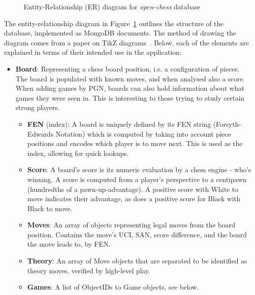\documentclass[architecture.tex]{subfiles}
\begin{document}
\begin{figure}[H]
    
    \caption{Entity-Relationship (ER) diagram for \textit{open-chess} database}
    \label{fig:er-diagram}
\end{figure}

The entity-relationship diagram in Figure~\ref{fig:er-diagram} outlines the structure of the 
database, implemented as MongoDB documents.
The method of drawing the diagram comes from a paper on TikZ diagrams~\cite{ertikz}.
Below, each of the elements are explained in terms of their intended
use in the application:

\begin{itemize}
    \item \textbf{Board}: Representing a chess board position, i.e. a configuration
        of pieces. The board is populated with known moves, and when analysed
        also a score. When adding games by PGN, boards can also hold information
        about what games they were seen in. This is interesting to those trying
        to study certain strong players.
        \begin{itemize}
            \item \textbf{FEN} (index): A board is uniquely defined
                by its FEN string (Forsyth-Edwards Notation)
                which is computed by taking into account piece positions and encodes
                which player is to move next.
                This is used as the index, allowing for quick lookups.
            \item \textbf{Score}: A board's score is its numeric evaluation by a chess
                engine - who's winning. A score is computed from a player's 
                perspective to a centipawn (hundredths of a pawn-up-advantage).
                A positive score with White to move indicates their advantage,
                as does a positive score for Black with Black to move.
            \item \textbf{Moves}: An array of objects representing legal moves from the
                board position. Contains the move's UCI, SAN, score difference,
                and the board the move leads to, by FEN.
            \item \textbf{Theory}: An array of Move objects that are separated to
                be identified as theory moves, verified by high-level play.
            \item \textbf{Games}: A list of ObjectIDs to Game objects, see below.
        \end{itemize}

\end{itemize}
\end{document}
